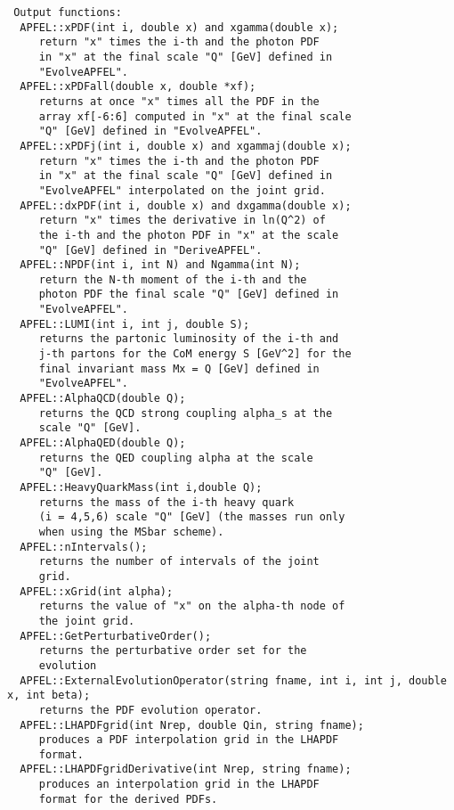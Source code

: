\documentclass[11pt,a4paper]{article}
\begin{document}
\begin{lstlisting}    
 Output functions:
  APFEL::xPDF(int i, double x) and xgamma(double x);
     return "x" times the i-th and the photon PDF
     in "x" at the final scale "Q" [GeV] defined in
     "EvolveAPFEL".
  APFEL::xPDFall(double x, double *xf);
     returns at once "x" times all the PDF in the
     array xf[-6:6] computed in "x" at the final scale
     "Q" [GeV] defined in "EvolveAPFEL".
  APFEL::xPDFj(int i, double x) and xgammaj(double x);
     return "x" times the i-th and the photon PDF
     in "x" at the final scale "Q" [GeV] defined in
     "EvolveAPFEL" interpolated on the joint grid.
  APFEL::dxPDF(int i, double x) and dxgamma(double x);
     return "x" times the derivative in ln(Q^2) of
     the i-th and the photon PDF in "x" at the scale
     "Q" [GeV] defined in "DeriveAPFEL".
  APFEL::NPDF(int i, int N) and Ngamma(int N);
     return the N-th moment of the i-th and the
     photon PDF the final scale "Q" [GeV] defined in
     "EvolveAPFEL".
  APFEL::LUMI(int i, int j, double S);
     returns the partonic luminosity of the i-th and
     j-th partons for the CoM energy S [GeV^2] for the
     final invariant mass Mx = Q [GeV] defined in 
     "EvolveAPFEL".
  APFEL::AlphaQCD(double Q);
     returns the QCD strong coupling alpha_s at the
     scale "Q" [GeV].
  APFEL::AlphaQED(double Q);
     returns the QED coupling alpha at the scale
     "Q" [GeV].
  APFEL::HeavyQuarkMass(int i,double Q);
     returns the mass of the i-th heavy quark
     (i = 4,5,6) scale "Q" [GeV] (the masses run only
     when using the MSbar scheme).
  APFEL::nIntervals();
     returns the number of intervals of the joint
     grid.
  APFEL::xGrid(int alpha);
     returns the value of "x" on the alpha-th node of
     the joint grid.
  APFEL::GetPerturbativeOrder();
     returns the perturbative order set for the
     evolution
  APFEL::ExternalEvolutionOperator(string fname, int i, int j, double x, int beta);
     returns the PDF evolution operator.
  APFEL::LHAPDFgrid(int Nrep, double Qin, string fname);
     produces a PDF interpolation grid in the LHAPDF
     format.
  APFEL::LHAPDFgridDerivative(int Nrep, string fname);
     produces an interpolation grid in the LHAPDF
     format for the derived PDFs.
\end{lstlisting}
\end{document}
